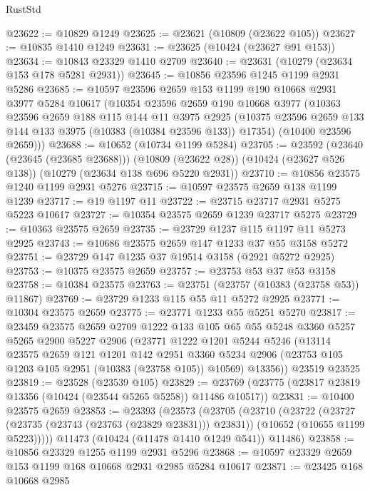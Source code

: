 \begin{lexlean}{RustStd}
\begin{coremodule}
@23622 := @10829 @1249
@23625 := @23621 (@10809 (@23622 @105))
@23627 := @10835 @1410 @1249
@23631 := @23625 (@10424 (@23627 @91 @153))
@23634 := @10843 @23329 @1410 @2709
@23640 := @23631 (@10279 (@23634 @153 @178 @5281 @2931))
@23645 := @10856 @23596 @1245 @1199 @2931 @5286
@23685 := @10597
    @23596
    @2659
    @153
    @1199
    @190
    @10668
    @2931
    @3977
    @5284
    @10617
    (@10354
      @23596
      @2659
      @190
      @10668
      @3977
      (@10363
        @23596
        @2659
        @188
        @115
        @144
        @11
        @3975
        @2925
        (@10375 @23596 @2659 @133 @144 @133 @3975 (@10383 (@10384 @23596 @133)) @17354)
        (@10400 @23596 @2659)))
@23688 := @10652 (@10734 @1199 @5284)
@23705 := @23592
    (@23640 (@23645 (@23685 @23688)))
    (@10809 (@23622 @28))
    (@10424 (@23627 @526 @138))
    (@10279 (@23634 @138 @696 @5220 @2931))
@23710 := @10856 @23575 @1240 @1199 @2931 @5276
@23715 := @10597 @23575 @2659 @138 @1199 @1239
@23717 := @19 @1197 @11
@23722 := @23715 @23717 @2931 @5275 @5223 @10617
@23727 := @10354 @23575 @2659 @1239 @23717 @5275
@23729 := @10363 @23575 @2659
@23735 := @23729 @1237 @115 @1197 @11 @5273 @2925
@23743 := @10686 @23575 @2659 @147 @1233 @37 @55 @3158 @5272
@23751 := @23729 @147 @1235 @37 @19514 @3158 (@2921 @5272 @2925)
@23753 := @10375 @23575 @2659
@23757 := @23753 @53 @37 @53 @3158
@23758 := @10384 @23575
@23763 := @23751 (@23757 (@10383 (@23758 @53)) @11867)
@23769 := @23729 @1233 @115 @55 @11 @5272 @2925
@23771 := @10304 @23575 @2659
@23775 := @23771 @1233 @55 @5251 @5270
@23817 := @23459
    @23575
    @2659
    @2709
    @1222
    @133
    @105
    @65
    @55
    @5248
    @3360
    @5257
    @5265
    @2900
    @5227
    @2906
    (@23771
      @1222
      @1201
      @5244
      @5246
      (@13114
        @23575
        @2659
        @121
        @1201
        @142
        @2951
        @3360
        @5234
        @2906
        (@23753 @105 @1203 @105 @2951 (@10383 (@23758 @105)) @10569)
        @13356))
    @23519
    @23525
@23819 := @23528 (@23539 @105)
@23829 := @23769 (@23775 (@23817 @23819 @13356 (@10424 (@23544 @5265 @5258)) @11486 @10517))
@23831 := @10400 @23575 @2659
@23853 := @23393
    (@23573
      (@23705
        (@23710
          (@23722
            (@23727 (@23735 (@23743 (@23763 (@23829 @23831))) @23831))
            (@10652 (@10655 @1199 @5223)))))
      @11473
      (@10424 (@11478 @1410 @1249 @541))
      @11486)
@23858 := @10856 @23329 @1255 @1199 @2931 @5296
@23868 := @10597 @23329 @2659 @153 @1199 @168 @10668 @2931 @2985 @5284 @10617
@23871 := @23425 @168 @10668 @2985

\end{coremodule}
\end{lexlean}
